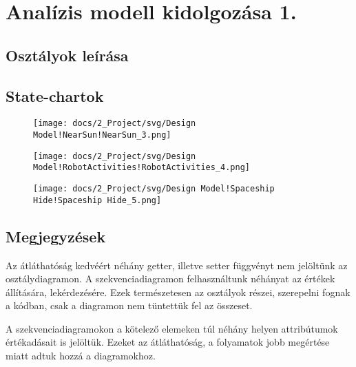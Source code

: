 \documentclass[../../projlab]{subfiles}
\begin{document}
\makeatletter


\makeatother

\chapter{Analízis modell kidolgozása 1.}


\section{Osztályok leírása}





\section{State-chartok}

\begin{figure}[H]
	\texttt{[image: docs/2\_Project/svg/Design Model!NearSun!NearSun\_3.png]}
	\centering
\end{figure}


\begin{figure}[H]
	\texttt{[image: docs/2\_Project/svg/Design Model!RobotActivities!RobotActivities\_4.png]}
	\centering
\end{figure}

\begin{figure}[H]
	\texttt{[image: docs/2\_Project/svg/Design Model!Spaceship Hide!Spaceship Hide\_5.png]}
	\centering
\end{figure}

\section{Megjegyzések}

Az átláthatóság kedvéért néhány getter, illetve setter függvényt nem jelöltünk az osztálydiagramon. A szekvenciadiagramon felhasználtunk néhányat az értékek állítására, lekérdezésére. Ezek természetesen az osztályok részei, szerepelni fognak a kódban, csak a diagramon nem tüntettük fel az összeset.

A szekvenciadiagramokon a kötelező elemeken túl néhány helyen attribútumok értékadásait is jelöltük. Ezeket az átláthatóság, a folyamatok jobb megértése miatt adtuk hozzá a diagramokhoz. 
\end{document}
